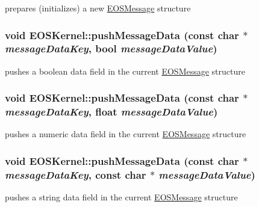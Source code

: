 prepares (initializes) a new \hyperlink{classEOSMessage}{EOSMessage} structure 

\hypertarget{structEOSKernel_335409b15526d516a8051199cc7fa619}{
\subsubsection[{pushMessageData}]{\setlength{\rightskip}{0pt plus 5cm}void EOSKernel::pushMessageData (const char $\ast$ {\em messageDataKey}, \/  bool {\em messageDataValue})}}
\label{structEOSKernel_335409b15526d516a8051199cc7fa619}


pushes a boolean data field in the current \hyperlink{classEOSMessage}{EOSMessage} structure 

\hypertarget{structEOSKernel_756f0c37601b7a9bc59832948a2b20ad}{
\subsubsection[{pushMessageData}]{\setlength{\rightskip}{0pt plus 5cm}void EOSKernel::pushMessageData (const char $\ast$ {\em messageDataKey}, \/  float {\em messageDataValue})}}
\label{structEOSKernel_756f0c37601b7a9bc59832948a2b20ad}


pushes a numeric data field in the current \hyperlink{classEOSMessage}{EOSMessage} structure 

\hypertarget{structEOSKernel_3e7745d89db284ffa185b399a88ff8e5}{
\subsubsection[{pushMessageData}]{\setlength{\rightskip}{0pt plus 5cm}void EOSKernel::pushMessageData (const char $\ast$ {\em messageDataKey}, \/  const char $\ast$ {\em messageDataValue})}}
\label{structEOSKernel_3e7745d89db284ffa185b399a88ff8e5}


pushes a string data field in the current \hyperlink{classEOSMessage}{EOSMessage} structure 

